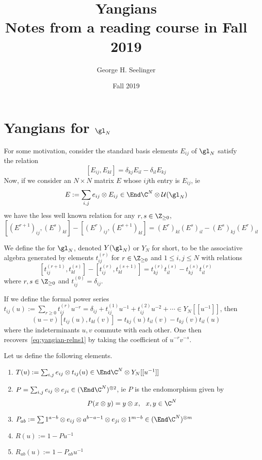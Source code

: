 \documentclass[11pt,leqno,oneside]{amsbook}
\title[Yangians]{Yangians \\ Notes
  from a reading course in Fall 2019}
\author{George H. Seelinger}
\date{Fall 2019}
\numberwithin{thm}{section}
\newcommand{\U}{\mathcal{U}}
\begin{document}
\maketitle
\section{Yangians for \(\gl_N\)}
For some motivation, consider the standard basis elements \(E_{ij}\)
of \(\gl_N\) satisfy the relation \[
  [E_{ij}, E_{kl}] = \delta_{kj} E_{il} - \delta_{il}E_{kj}
\]
Now, if we consider an \(N\times N\) matrix \(E\) whose \(ij\)th entry
is \(E_{ij}\), ie \[
  E := \sum_{i,j} e_{ij} \otimes E_{ij} \in \End \C^N \otimes \U(\gl_N)
\]
we have the less well known relation for any \(r,s \in \Z_{\geq 0}\), \[
  [(E^{r+1})_{ij}, (E^s)_{kl}] - [(E^r)_{ij}, (E^{s+1})_{kl}] =
  (E^r)_{kl}(E^s)_{il} - (E^s)_{kj}(E^r)_{il}
\]
\begin{defn}
  We define the  for \(\gl_N\), denoted \(Y(\gl_N)\) or
  \(Y_N\) for short, to be the associative algebra generated by
  elements \(t_{ij}^{(r)}\) for \(r \in \Z_{\geq 0}\) and \(1 \leq
  i,j \leq N\) with relations
  \begin{equation}
    \label{eq:yangian-relns1}
        [t_{ij}^{(r+1)},t_{kl}^{(s)}] - [t_{ij}^{(r)}, t_{kl}^{(s+1)}] =
        t_{kj}^{(r)}t_{il}^{(s)} - t_{kj}^{(s)}t_{il}^{(r)} 
  \end{equation}
  where \(r,s \in \Z_{\geq 0}\) and \(t_{ij}^{(0)} = \delta_{ij}\).
\end{defn}
If we define the formal power series \(t_{ij}(u) := \sum_{r \geq 0}
t^{(r)}_{ij}u^{-r} = \delta_{ij} + t^{(1)}_{ij}u^{-1} +
t^{(2)}_{ij}u^{-2} + \cdots \in Y_N[[u^{-1}]]\), then
\begin{equation}
  \label{eq:yangian-relns2}
  (u-v)[t_{ij}(u),t_{kl}(v)] = t_{kj}(u)t_{il}(v) - t_{kj}(v)t_{il}(u)
\end{equation}
where the indeterminants \(u,v\) commute with each other. One then
recovers~\ref{eq:yangian-relns1} by taking the coefficient of 
\(u^{-r}v^{-s}\).
\begin{defn}
  Let us define the following elements.
  \begin{enumerate}
  \item \(T(u) := \sum_{i,j} e_{ij} \otimes t_{ij}(u) \in \End \C^N
    \otimes Y_N[[u^{-1}]]\)
  \item \(P = \sum_{i,j} e_{ij} \otimes e_{ji} \in (\End
    \C^N)^{\otimes 2}\), ie \(P\) is the endomorphism given by \[
      P(x \otimes y) = y \otimes x, \ \ x,y \in \C^N
    \]
  \item \(P_{ab} := \sum 1^{a-b} \otimes e_{ij} \otimes a^{b-a-1}
    \otimes e_{ji} \otimes 1^{m-b} \in (\End \C^N)^{\otimes m}\)
  \item \(R(u) := 1-Pu^{-1}\)
  \item \(R_{ab}(u) := 1-P_{ab}u^{-1}\)
  \end{enumerate}
\end{defn}
\end{document}
